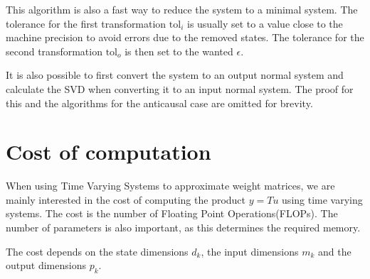 \documentclass[doctype=mastersthesis,BCOR=15mm,biblatex]{ldvbook}%
\begin{document}
This algorithm is also a fast way to reduce the system to a minimal system.
The tolerance for the first transformation $\text{tol}_i$ is usually set to a value close to the machine precision to avoid errors due to the removed states.
The tolerance for the second transformation $\text{tol}_o$ is then set to the wanted $\epsilon$.
 
It is also possible to first convert the system to an output normal system and calculate the SVD when converting it to an input normal system.
The proof for this and the algorithms for the anticausal case are omitted for brevity.

 
 

\section{Cost of computation} \label{sec:cost}
When using Time Varying Systems to approximate weight matrices, we are mainly interested in the cost of computing the product $y = Tu$ using time varying systems.
The cost is the number of Floating Point Operations(FLOPs).
The number of parameters is also important, as this determines the required memory.

The cost depends on the state dimensions $d_k$, the input dimensions $m_k$ and the output dimensions $p_k$.
\end{document}
